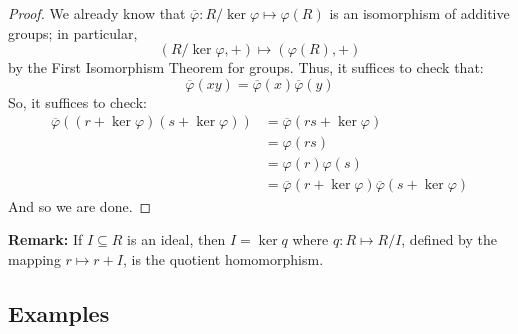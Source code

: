 \documentclass[letterpaper]{article}
\begin{document}
\begin{mdframed}[]
    \begin{proof}
        We already know that $\overline{\varphi}: R / \ker \varphi \mapsto \varphi(R)$ is an isomorphism of additive groups; in particular,
        \[(R / \ker \varphi, +) \mapsto (\varphi(R), +)\]
        by the First Isomorphism Theorem for groups. Thus, it suffices to check that:
        \[\overline{\varphi}(xy) = \overline{\varphi}(x) \overline{\varphi}(y)\]
        So, it suffices to check:
        \begin{equation*}
            \begin{aligned}
                \overline{\varphi}((r + \ker\varphi)(s + \ker\varphi)) &= \overline{\varphi}(rs + \ker\varphi) \\ 
                    &= \varphi(rs) \\ 
                    &= \varphi(r)\varphi(s) \\ 
                    &= \overline{\varphi}(r + \ker\varphi) \overline{\varphi}(s + \ker\varphi)
            \end{aligned}
        \end{equation*}
        And so we are done. 
    \end{proof}
\end{mdframed}
\textbf{Remark:} If $I \subseteq R$ is an ideal, then $I = \ker q$ where $q: R \mapsto R / I$, defined by the mapping $r \mapsto r + I$, is the quotient homomorphism.

\subsection{Examples}
\end{document}
